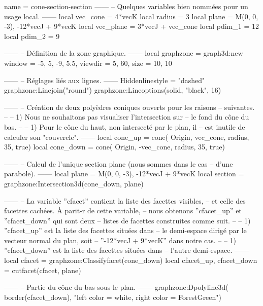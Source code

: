 \documentclass[varwidth, border = 3pt]{standalone}
\begin{document}
\begin{luadraw}{name = cone-section-section}
------
-- Quelques variables bien nommées pour un usage local.
------
    local vec_cone  = 4*vecK
    local radius    = 3
    local plane     = {M(0, 0, -3), -12*vecJ + 9*vecK}
    local vec_plane = 3*vecJ + vec_cone
    local pdim_1    = 12
    local pdim_2    = 9

------
-- Définition de la zone graphique.
------
    local graphzone = graph3d:new{
        window  = {-5, 5, -9, 5.5},
        viewdir = {5, 60},
        size    = {10, 10}
    }

------
-- Réglages liés aux lignes.
------
    Hiddenlinestyle = "dashed"
    graphzone:Linejoin("round")
    graphzone:Lineoptions(solid, "black", 16)

------
-- Création de deux polyèdres coniques ouverts pour les raisons
-- suivantes.
--
--     1) Nous ne souhaitons pas visualiser l'intersection sur
--     le fond du cône du bas.
--
--     1) Pour le cône du haut, non intersecté par le plan, il
--     est inutile de calculer son "couvercle".
------
    local cone_up = cone(
        Origin, vec_cone, radius,
        35,
        true)
    local cone_down = cone(
        Origin, -vec_cone, radius,
        35,
        true)

------
-- Calcul de l'unique section plane (nous sommes dans le cas
-- d'une parabole).
------
    local plane   = {M(0, 0, -3), -12*vecJ + 9*vecK}
    local section = graphzone:Intersection3d(cone_down, plane)

------
-- La variable ''cfacet'' contient la liste des facettes visibles,
-- et celle des facettes cachées. À parit-r de cette variable,
-- nous obtenons ''cfacet_up'' et ''cfacet_down'' qui sont deux
-- listes de facettes construites comme suit.
--
--     1) ''cfacet_up'' est la liste des facettes situées dans
--     le demi-espace dirigé par le vecteur normal du plan, soit
--     ''-12*vecJ + 9*vecK'' dans notre cas.
--
--     1) ''cfacet_down'' est la liste des facettes situées dans
--     l’autre demi-espace.
------
    local cfacet                 = graphzone:Classifyfacet(cone_down)
    local cfacet_up, cfacet_down = cutfacet(cfacet, plane)

------
-- Partie du cône du bas sous le plan.
------
    graphzone:Dpolyline3d(
        border(cfacet_down),
        "left color = white, right color = ForestGreen")


\end{luadraw}
\end{document}

